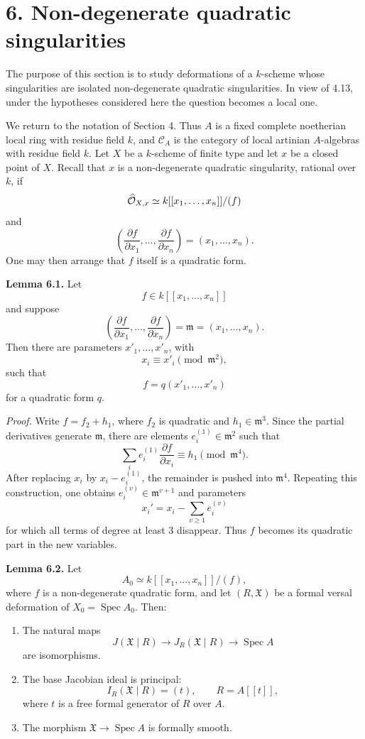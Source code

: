 \documentclass[11pt]{article}
\providecommand{\Spec}{\operatorname{Spec}}
\begin{document}
\section*{6. Non-degenerate quadratic singularities}

The purpose of this section is to study deformations of a \(k\)-scheme whose singularities are isolated non-degenerate quadratic singularities.  In view of 4.13, under the hypotheses considered here the question becomes a local one.

We return to the notation of Section 4.  Thus \(A\) is a fixed complete noetherian local ring with residue field \(k\), and \(\mathcal C_A\) is the category of local artinian \(A\)-algebras with residue field \(k\).  Let \(X\) be a \(k\)-scheme of finite type and let \(x\) be a closed point of \(X\).  Recall that \(x\) is a non-degenerate quadratic singularity, rational over \(k\), if
\[
        \widehat{\mathcal O}_{X,x}
        \simeq
        k[[x_1,\ldots,x_n]]/(f)
\]
and
\[
        \left(\frac{\partial f}{\partial x_1},\ldots,
        \frac{\partial f}{\partial x_n}\right)=(x_1,\ldots,x_n).
\]
One may then arrange that \(f\) itself is a quadratic form.

\textbf{Lemma 6.1.}  Let
\[
        f\in k[[x_1,\ldots,x_n]]
\]
and suppose
\[
        \left(\frac{\partial f}{\partial x_1},\ldots,
        \frac{\partial f}{\partial x_n}\right)=\mathfrak m=(x_1,\ldots,x_n).
\]
Then there are parameters \(x'_1,\ldots,x'_n\), with
\[
        x_i\equiv x'_i\pmod{\mathfrak m^2},
\]
such that
\[
        f=q(x'_1,\ldots,x'_n)
\]
for a quadratic form \(q\).

\emph{Proof.}  Write \(f=f_2+h_1\), where \(f_2\) is quadratic and \(h_1\in\mathfrak m^3\).  Since the partial derivatives generate \(\mathfrak m\), there are elements \(e_i^{(1)}\in\mathfrak m^2\) such that
\[
        \sum_i e_i^{(1)}\frac{\partial f}{\partial x_i}
        \equiv h_1\pmod{\mathfrak m^4}.
\]
After replacing \(x_i\) by \(x_i-e_i^{(1)}\), the remainder is pushed into \(\mathfrak m^4\).  Repeating this construction, one obtains \(e_i^{(v)}\in\mathfrak m^{v+1}\) and parameters
\[
        x_i' = x_i-\sum_{v\geq 1}e_i^{(v)}
\]
for which all terms of degree at least \(3\) disappear.  Thus \(f\) becomes its quadratic part in the new variables.

\textbf{Lemma 6.2.}  Let
\[
        A_0\simeq k[[x_1,\ldots,x_n]]/(f),
\]
where \(f\) is a non-degenerate quadratic form, and let \((R,\mathfrak X)\) be a formal versal deformation of \(X_0=\Spec A_0\).  Then:
\begin{enumerate}[label=(\arabic*)]
\item The natural maps
\[
        J(\mathfrak X\mid R)\longrightarrow J_R(\mathfrak X\mid R)
        \longrightarrow \Spec A
\]
are isomorphisms.
\item The base Jacobian ideal is principal:
\[
        I_R(\mathfrak X\mid R)=(t),
        \qquad
        R=A[[t]],
\]
where \(t\) is a free formal generator of \(R\) over \(A\).
\item The morphism \(\mathfrak X\to\Spec A\) is formally smooth.
\end{enumerate}
\end{document}
